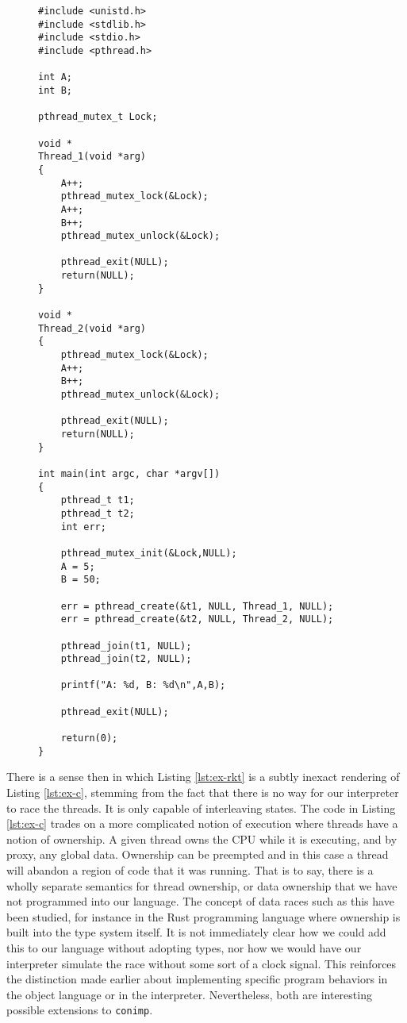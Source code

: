 \begin{figure}
\begin{lstlisting}[label={lst:ex-c},caption={Two threads concurrently updating a global store (C).},captionpos=b,frame=single]
#include <unistd.h>
#include <stdlib.h>
#include <stdio.h>
#include <pthread.h>

int A;
int B;

pthread_mutex_t Lock;

void *
Thread_1(void *arg)
{
	A++;
	pthread_mutex_lock(&Lock);
	A++;
	B++;
	pthread_mutex_unlock(&Lock);

	pthread_exit(NULL);
	return(NULL);
}

void *
Thread_2(void *arg)
{
	pthread_mutex_lock(&Lock);
	A++;
	B++;
	pthread_mutex_unlock(&Lock);

	pthread_exit(NULL);
	return(NULL);
}

int main(int argc, char *argv[])
{
	pthread_t t1;
	pthread_t t2;
	int err;

	pthread_mutex_init(&Lock,NULL);
	A = 5;
	B = 50;

	err = pthread_create(&t1, NULL, Thread_1, NULL);
	err = pthread_create(&t2, NULL, Thread_2, NULL);

	pthread_join(t1, NULL);
	pthread_join(t2, NULL);

	printf("A: %d, B: %d\n",A,B);

	pthread_exit(NULL);

	return(0);
}
\end{lstlisting}
\end{figure}

There is a sense then in which Listing \ref{lst:ex-rkt} is a subtly inexact rendering of Listing \ref{lst:ex-c}, stemming from the fact that there is no way for our interpreter to race the threads.  It is only capable of interleaving states.  The code in Listing \ref{lst:ex-c} trades on a more complicated notion of execution where threads have a notion of ownership.  A given thread owns the CPU while it is executing, and by proxy, any global data.  Ownership can be preempted and in this case a thread will abandon a region of code that it was running.  That is to say, there is a wholly separate semantics for thread ownership, or data ownership that we have not programmed into our language.  The concept of data races such as this have been studied, for instance in the Rust programming language \citep{rust2018} where ownership is built into the type system itself.  It is not immediately clear how we could add this to our language without adopting types, nor how we would have our interpreter simulate the race without some sort of a clock signal.  This reinforces the distinction made earlier about implementing specific program behaviors in the object language or in the interpreter.  Nevertheless, both are interesting possible extensions to \texttt{conimp}.  

